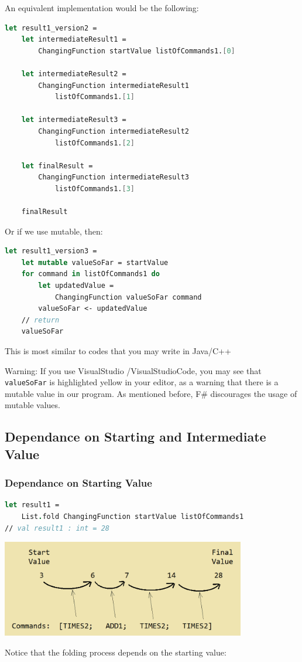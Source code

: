 \documentclass[12pt]{article}
\begin{document}
An equivalent implementation would be the following:

\begin{lstlisting}[language=FSharp]
let result1_version2 =
    let intermediateResult1 = 
        ChangingFunction startValue listOfCommands1.[0]

    let intermediateResult2 = 
        ChangingFunction intermediateResult1 
            listOfCommands1.[1]

    let intermediateResult3 = 
        ChangingFunction intermediateResult2 
            listOfCommands1.[2]

    let finalResult = 
        ChangingFunction intermediateResult3 
            listOfCommands1.[3]

    finalResult
\end{lstlisting}
Or if we use mutable, then:
\begin{lstlisting}[language=FSharp]
let result1_version3 =
    let mutable valueSoFar = startValue
    for command in listOfCommands1 do
        let updatedValue =
            ChangingFunction valueSoFar command
        valueSoFar <- updatedValue
    // return
    valueSoFar
\end{lstlisting}
This is most similar to codes that you may write in Java/C++

Warning: If you use VisualStudio /VisualStudioCode, you may see that \texttt{valueSoFar} is highlighted yellow in your editor, as a warning that there is a mutable value in our program. As mentioned before, F\# discourages the usage of mutable values.

\vfill

\pagebreak

\subsection{Dependance on Starting and Intermediate Value}

\subsubsection*{Dependance on Starting Value}

\begin{lstlisting}[language=FSharp]
let result1 =
    List.fold ChangingFunction startValue listOfCommands1
// val result1 : int = 28
\end{lstlisting}
\begin{center}
\includegraphics[width=0.8\textwidth]{pictures/picture31.png}
\end{center}
Notice that the folding process depends on the starting value:
\end{document}
